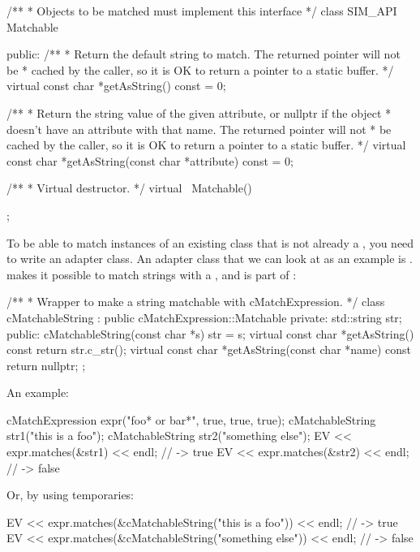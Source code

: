 \begin{cpp}
/**
 * Objects to be matched must implement this interface
 */
class SIM_API Matchable
{
  public:
    /**
     * Return the default string to match. The returned pointer will not be
     * cached by the caller, so it is OK to return a pointer to a static buffer.
     */
    virtual const char *getAsString() const = 0;

    /**
     * Return the string value of the given attribute, or nullptr if the object
     * doesn't have an attribute with that name. The returned pointer will not
     * be cached by the caller, so it is OK to return a pointer to a static buffer.
     */
    virtual const char *getAsString(const char *attribute) const = 0;

    /**
     * Virtual destructor.
     */
    virtual ~Matchable() {}
};
\end{cpp}

To be able to match instances of an existing class that is not already a
, you need to write an adapter class. An adapter class that
we can look at as an example is . 
makes it possible to match strings with a , and is part
of {\opp}:

\begin{cpp}
/**
 * Wrapper to make a string matchable with cMatchExpression.
 */
class cMatchableString : public cMatchExpression::Matchable
{
  private:
    std::string str;
  public:
    cMatchableString(const char *s) {str = s;}
    virtual const char *getAsString() const {return str.c_str();}
    virtual const char *getAsString(const char *name) const {return nullptr;}
};
\end{cpp}

An example:

\begin{cpp}
cMatchExpression expr("foo* or bar*", true, true, true);
cMatchableString str1("this is a foo");
cMatchableString str2("something else");
EV << expr.matches(&str1) << endl; // -> true
EV << expr.matches(&str2) << endl; // -> false
\end{cpp}

Or, by using temporaries:

\begin{cpp}
EV << expr.matches(&cMatchableString("this is a foo")) << endl; // -> true
EV << expr.matches(&cMatchableString("something else")) << endl; // -> false
\end{cpp}



